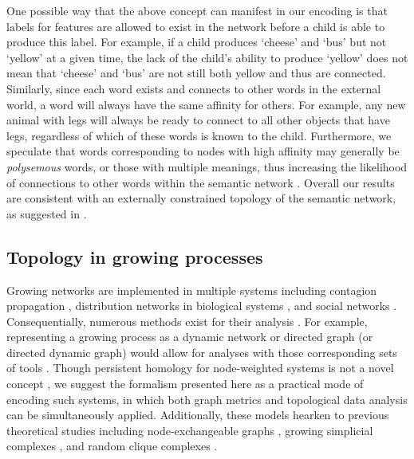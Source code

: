 \documentclass{article}
\begin{document}
One possible way that the above concept can manifest in our encoding is that labels for features are allowed to exist in the network before a child is able to produce this label. For example, if a child produces `cheese' and `bus' but not `yellow' at a given time, the lack of the child's ability to produce `yellow' does not mean that `cheese' and `bus' are not still both yellow and thus are connected. Similarly, since each word exists and connects to other words in the external world, a word will always have the same affinity for others. For example, any new animal with legs will always be ready to connect to all other objects that have legs, regardless of which of these words is known to the child. Furthermore, we speculate that words corresponding to nodes with high affinity may generally be \emph{polysemous} words, or those with multiple meanings, thus increasing the likelihood of connections to other words within the semantic network \cite{sole2015ambiguity}. Overall our results are consistent with an externally constrained topology of the semantic network, as suggested in \cite{hills2009longitudinal,steyvers2005large}.


\subsection*{Topology in growing processes}

Growing networks are implemented in multiple systems including contagion propagation \cite{taylor2015topological}, distribution networks in biological systems \cite{papadopoulos2016embedding}, and social networks \cite{jin2001structure}. Consequentially, numerous methods exist for their analysis \cite{holme2012temporal}. For example, representing a growing process as a dynamic network or directed graph (or directed dynamic graph) would allow for analyses with those corresponding sets of tools \cite{chowdhury2016persistent,sizemore2017dynamic}. Though persistent homology for node-weighted systems is not a novel concept \cite{taylor2015topological,hofer2017deep,courtney2017weighted}, we suggest the formalism presented here as a practical mode of encoding such systems, in which both graph metrics and topological data analysis can be simultaneously applied. Additionally, these models hearken to previous theoretical studies including node-exchangeable graphs \cite{aldous1985exchangeability,hoover1979relations}, growing simplicial complexes \cite{courtney2017weighted,bianconi2016emergent}, and random clique complexes \cite{kahle2013limit}.
\end{document}
